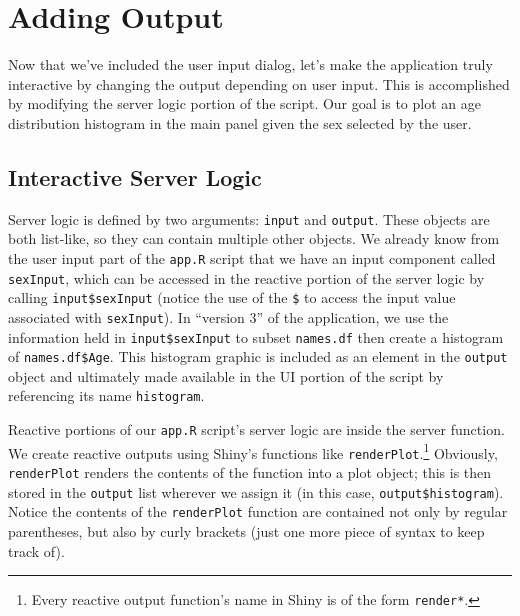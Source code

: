 \documentclass[
]{krantz}
\begin{document}
\hypertarget{adding-output}{%
\section{Adding Output}\label{adding-output}}

Now that we've included the user input dialog, let's make the application truly interactive by changing the output depending on user input. This is accomplished by modifying the server logic portion of the script. Our goal is to plot an age distribution histogram in the main panel given the sex selected by the user.

\hypertarget{interactive-server-logic}{%
\subsection{Interactive Server Logic}\label{interactive-server-logic}}

Server logic is defined by two arguments: \texttt{input} and \texttt{output}. These objects are both list-like, so they can contain multiple other objects. We already know from the user input part of the \texttt{app.R} script that we have an input component called \texttt{sexInput}, which can be accessed in the reactive portion of the server logic by calling \texttt{input\$sexInput} (notice the use of the \texttt{\$} to access the input value associated with \texttt{sexInput}). In ``version 3'' of the application, we use the information held in \texttt{input\$sexInput} to subset \texttt{names.df} then create a histogram of \texttt{names.df\$Age}. This histogram graphic is included as an element in the \texttt{output} object and ultimately made available in the UI portion of the script by referencing its name \texttt{histogram}.

Reactive portions of our \texttt{app.R} script's server logic are inside the server function. We create reactive outputs using Shiny's functions like \texttt{renderPlot}.\footnote{Every reactive output function's name in Shiny is of the form \texttt{render*}.} Obviously, \texttt{renderPlot} renders the contents of the function into a plot object; this is then stored in the \texttt{output} list wherever we assign it (in this case, \texttt{output\$histogram}). Notice the contents of the \texttt{renderPlot} function are contained not only by regular parentheses, but also by curly brackets (just one more piece of syntax to keep track of).
\end{document}
